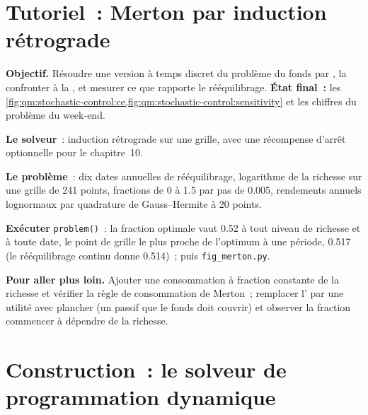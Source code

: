 \section{Tutoriel~: Merton par induction rétrograde}\label{tut:qm:stochastic-control:merton}

\begin{tutorial}
\textbf{Objectif.} Résoudre une version à temps discret du problème du fonds par , la confronter
à la , et mesurer ce que rapporte le rééquilibrage. \textbf{État final~:}
les \cref{fig:qm:stochastic-control:ce,fig:qm:stochastic-control:sensitivity} et les chiffres du problème du week-end.
\begin{tutsteps}
\item \textbf{Le solveur}~: induction rétrograde sur une grille, avec une récompense d'arrêt optionnelle pour le chapitre~10.
\label{lst:qm:stochastic-control:dp}
\item \textbf{Le problème}~: dix dates annuelles de rééquilibrage, logarithme de la richesse sur une grille de 241 points, fractions de 0 à 1.5
par pas de 0.005, rendements annuels lognormaux par quadrature de Gauss--Hermite à 20 points.
\label{lst:qm:stochastic-control:merton}
\item \textbf{Exécuter} \texttt{problem()}~: la fraction optimale vaut 0.52 à tout niveau de richesse et à toute date, le point de grille
le plus proche de l'optimum à une période, 0.517 (le rééquilibrage continu donne 0.514)~; puis \texttt{fig\_merton.py}.
\end{tutsteps}
\textbf{Pour aller plus loin.} Ajouter une consommation à fraction constante de la richesse et vérifier la règle de consommation de Merton~;
remplacer l' par une utilité avec plancher (un passif que le fonds doit couvrir) et observer la fraction commencer à dépendre de
la richesse.
\end{tutorial}

\section{Construction~: le solveur de programmation dynamique}\label{bld:qm:stochastic-control:dpsolve}

